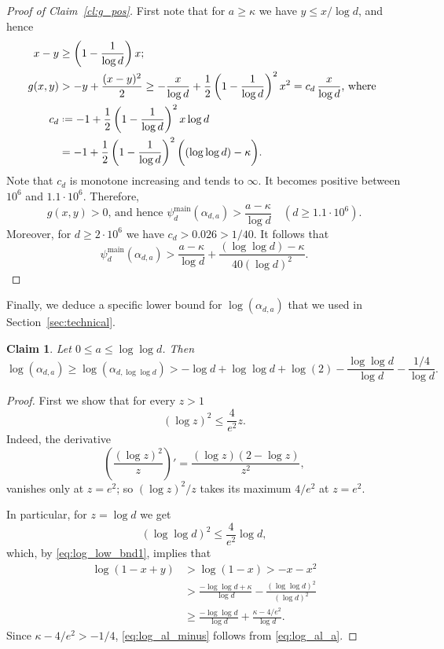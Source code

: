 \documentclass[12pt]{amsart}
\newtheorem{claim}[theorem]{Claim}
\theoremstyle{definition}
\newcommand\al{\alpha}
\newcommand\ka{\kappa}
\newcommand\psimain{\psi^{\mathrm{main}}}
\newcommand{\defeq}{\mathrel{\vcenter{\baselineskip0.5ex \lineskiplimit0pt
                     \hbox{\scriptsize.}\hbox{\scriptsize.}}}%
                     =}
\begin{document}
%
\begin{proof}[Proof of Claim~\ref{cl:g_pos}]
First note that for $a \geq \ka$ we have $y \leq x / \log d$, and hence 
%
\begin{align*}
x-y 
&\geq \left( 1-\frac{1}{\log d} \right) x ;\\
g(x,y) &> - y + \frac{(x-y)^2}{2} 
\geq -\frac{x}{\log d} 
+ \frac 12 \left( 1-\frac{1}{\log d} \right)^2 x^2 
= c_d \, \frac{x}{\log d} \text{, where } \\
c_d &\defeq -1 
+\frac 12 \left( 1-\frac{1}{\log d} \right)^2 x \log d \\
&= -1 + \frac 12 \left( 1-\frac{1}{\log d} \right)^2
\bigg( (\log\log d) - \ka \bigg) .
\end{align*}
%
Note that $c_d$ is monotone increasing and tends to $\infty$. It becomes positive between $10^6$ and $1.1 \cdot 10^6$. Therefore, 
%
\[ g(x,y)>0 
\text{, and hence }
\psimain_d( \al_{d,a} ) > \frac{a-\ka}{\log d}
\quad (d \geq 1.1 \cdot 10^6) .\]
%
Moreover, for $d \geq 2 \cdot 10^6$ we have $c_d > 0.026 > 1/40$. It follows that 
%
%
\[ \psimain_d(\al_{d,a}) > \frac{a-\ka}{\log d} 
+ \frac{(\log\log d)-\ka}{40(\log d)^2} . \]
%
\end{proof}
%

Finally, we deduce a specific lower bound for $\log( \al_{d,a} )$ that we used in Section~\ref{sec:technical}.
%
\begin{claim} \label{cl:log_al_minus}
Let $0 \leq a \leq \log\log d$. Then  
%
\begin{equation} \label{eq:log_al_minus} 
\log( \al_{d,a} ) \geq \log( \al_{d,\log\log d} ) 
> -\log d + \log\log d + \log(2) 
- \frac{\log\log d}{\log d}
- \frac{1/4}{\log d} .
\end{equation}
%
\end{claim}
%
\begin{proof}
First we show that for every $z>1$ 
%
\[ (\log z)^2 \leq \frac{4}{e^2} z .\]
%
Indeed, the derivative  
%
\[ \left( \frac{(\log z)^2}{z} \right)'= 
\frac{(\log z)(2- \log z)}{z^2} ,\]
%
vanishes only at $z=e^2$; so $(\log z)^2/z$ takes its maximum $4/e^2$ at $z=e^2$.  

In particular, for $z= \log d$ we get 
%
\begin{equation*} \label{eq:loglog_vs_log}
(\log\log d)^2 \leq \frac{4}{e^2} \log d ,
\end{equation*}
%
which, by \eqref{eq:log_low_bnd1}, implies that 
%
\begin{align*}
\log( 1-x+y ) &> \log(1-x) > -x - x^2 \\
&> \frac{- \log \log d + \ka}{\log d} 
- \frac{(\log\log d)^2}{(\log d)^2} \\
&\geq \frac{- \log \log d}{\log d} 
+ \frac{\ka - 4/e^2}{\log d} .
\end{align*} 
%
Since $\ka-4/e^2>-1/4$, \eqref{eq:log_al_minus} follows from \eqref{eq:log_al_a}. 
\end{proof}
%
\end{document}
